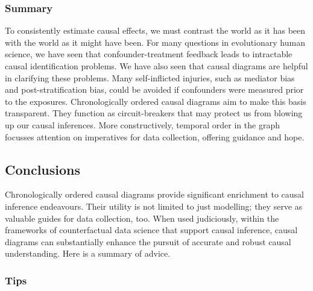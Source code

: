 \documentclass[
  singlecolumn,
  9pt]{article}
\begin{document}
\subsubsection{Summary}\label{summary}

To consistently estimate causal effects, we must contrast the world as
it has been with the world as it might have been. For many questions in
evolutionary human science, we have seen that confounder-treatment
feedback leads to intractable causal identification problems. We have
also seen that causal diagrams are helpful in clarifying these problems.
Many self-inflicted injuries, such as mediator bias and
post-stratification bias, could be avoided if confounders were measured
prior to the exposures. Chronologically ordered causal diagrams aim to
make this basis transparent. They function as circuit-breakers that may
protect us from blowing up our causal inferences. More constructively,
temporal order in the graph focusses attention on imperatives for data
collection, offering guidance and hope.

\subsection{Conclusions}\label{conclusions}

Chronologically ordered causal diagrams provide significant enrichment
to causal inference endeavours. Their utility is not limited to just
modelling; they serve as valuable guides for data collection, too. When
used judiciously, within the frameworks of counterfactual data science
that support causal inference, causal diagrams can substantially enhance
the pursuit of accurate and robust causal understanding. Here is a
summary of advice.

\subsubsection{Tips}\label{tips}
\end{document}
